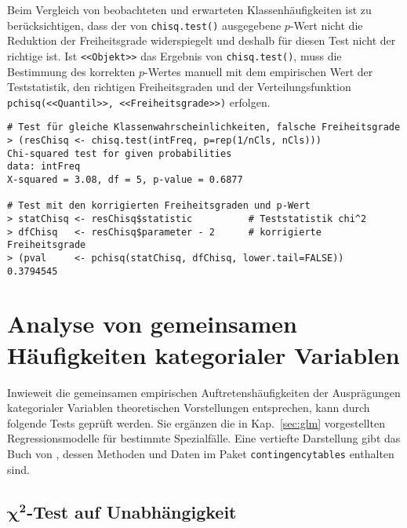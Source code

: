 Beim Vergleich von beobachteten und erwarteten Klassenhäufigkeiten ist zu berücksichtigen, dass der von \lstinline!chisq.test()! ausgegebene $p$-Wert nicht die Reduktion der Freiheitsgrade widerspiegelt und deshalb für diesen Test nicht der richtige ist. Ist \lstinline!<<Objekt>>! das Ergebnis von \lstinline!chisq.test()!, muss die Bestimmung des korrekten $p$-Wertes manuell mit dem empirischen Wert der Teststatistik, den richtigen Freiheitsgraden und der Verteilungsfunktion \lstinline!pchisq(<<Quantil>>, <<Freiheitsgrade>>)! erfolgen.
\begin{lstlisting}
# Test für gleiche Klassenwahrscheinlichkeiten, falsche Freiheitsgrade
> (resChisq <- chisq.test(intFreq, p=rep(1/nCls, nCls)))
Chi-squared test for given probabilities
data: intFreq
X-squared = 3.08, df = 5, p-value = 0.6877

# Test mit den korrigierten Freiheitsgraden und p-Wert
> statChisq <- resChisq$statistic          # Teststatistik chi^2
> dfChisq   <- resChisq$parameter - 2      # korrigierte Freiheitsgrade
> (pval     <- pchisq(statChisq, dfChisq, lower.tail=FALSE))
0.3794545
\end{lstlisting}

\section{Analyse von gemeinsamen Häufigkeiten kategorialer Variablen}
\label{sec:freqNonparam}

Inwieweit die gemeinsamen empirischen Auftretenshäufigkeiten der Ausprägungen kategorialer Variablen theoretischen Vorstellungen entsprechen, kann durch folgende Tests geprüft werden. Sie ergänzen die in Kap.\ \ref{sec:glm} vorgestellten Regressionsmodelle für bestimmte Spezialfälle. Eine vertiefte Darstellung gibt das Buch von , dessen Methoden und Daten im Paket \lstinline!contingencytables! \cite{Fagerland2024} enthalten sind.

\subsection[\texorpdfstring{$\chi^{2}$}{chi2}-Test auf Unabhängigkeit]{$\bm{\chi^{2}}$-Test auf Unabhängigkeit}
\label{sec:chisqInd}

